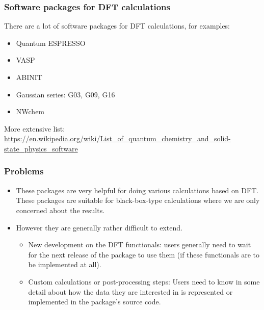 \begin{frame}
\frametitle{Software packages for DFT calculations}

There are a lot of software packages for DFT calculations, for examples:
\begin{itemize}
\item Quantum ESPRESSO
\item VASP
\item ABINIT
\item Gaussian series: G03, G09, G16
\item NWchem
\end{itemize}

More extensive list:
{\scriptsize
\url{https://en.wikipedia.org/wiki/List_of_quantum_chemistry_and_solid-state_physics_software}
}

\end{frame}


\begin{frame}
\frametitle{Problems}

\begin{itemize}
\item These packages are very helpful for doing various calculations based on DFT.
%
These packages are suitable for black-box-type calculations where we are only concerned about the results.
%
\item However they are generally rather difficult to extend.
  \begin{itemize}
  \item New development on the DFT functionals:
  users generally need to wait for the next release of the package to use them
  (if these functionals are to be implemented at all).
  \item Custom calculations or post-processing steps:
  Users need to know in some detail
  about how the data they are interested in is represented or implemented in the package's source code.
  \end{itemize}
\end{itemize}

\end{frame}

